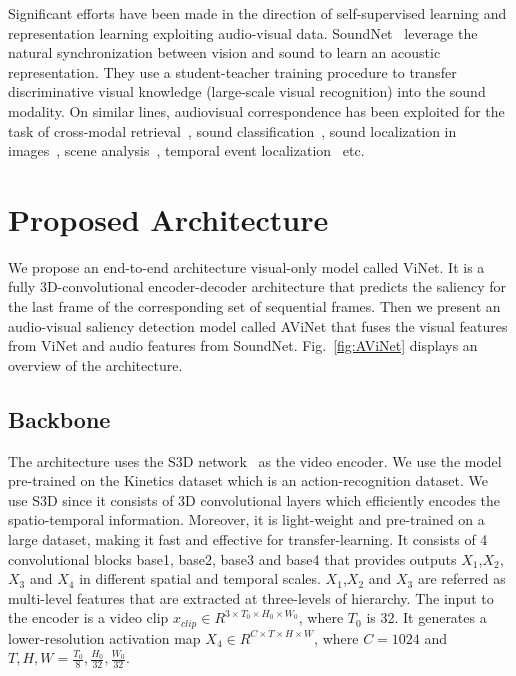 \documentclass[letterpaper, 10 pt, conference]{ieeeconf}  \usepackage{times}
\begin{document}
Significant efforts have been made in the direction of self-supervised learning and representation learning exploiting audio-visual data. SoundNet~\cite{aytar2016soundnet} leverage the natural synchronization between vision and sound to learn an acoustic representation. They use a student-teacher training procedure to transfer discriminative visual knowledge (large-scale visual recognition) into the sound modality. On similar lines, audiovisual correspondence has been exploited for the task of cross-modal retrieval~\cite{arandjelovic2018objects}, sound classification~\cite{aytar2016soundnet, arandjelovic2017look}, sound localization in images~\cite{arandjelovic2018objects, senocak2018learning}, scene analysis~\cite{owens2018audio}, temporal event localization~\cite{tian2018audio} etc.



















\section{Proposed Architecture}

We propose an end-to-end architecture visual-only model called ViNet. It is a fully 3D-convolutional encoder-decoder architecture that predicts the saliency for the last frame of the corresponding set of sequential frames. Then we present an audio-visual saliency detection model called AViNet that fuses the visual features from ViNet and audio features from SoundNet. Fig.~\ref{fig:AViNet} displays an overview of the architecture. 

\subsection{Backbone}
The architecture uses the S3D network~\cite{xie2018rethinking} as the video encoder. We use the model pre-trained on the Kinetics dataset which is an action-recognition dataset. We use S3D since it consists of 3D convolutional layers which efficiently encodes the spatio-temporal information. Moreover, it is light-weight and pre-trained on a large dataset, making it fast and effective for transfer-learning. It consists of 4 convolutional blocks base1, base2, base3 and base4 that provides outputs $X_1$,$X_2$,$X_3$ and $X_4$ in different spatial and temporal scales. $X_1$,$X_2$ and $X_3$ are referred as multi-level features that are extracted at three-levels of hierarchy. The input to the encoder is a video clip $x_{clip}\in R^{3\times T_{0} \times H_{0} \times W_{0}}$, where $T_{0}$ is 32. It generates a lower-resolution activation map $X_4\in R^{C\times T \times H \times W}$, where $C=1024$ and $T, H, W=\frac{T_{0}}{8}, \frac{H_{0}}{32}, \frac{W_{0}}{32}$.
\end{document}
